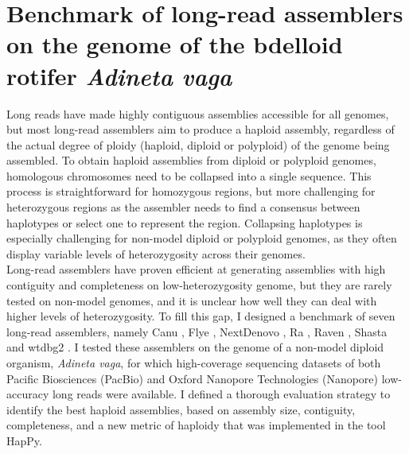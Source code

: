 
\newcommand{\beginsupplement}{%
        \setcounter{table}{0}
        \renewcommand{\thetable}{S\arabic{table}}%
        \setcounter{figure}{0}
        \renewcommand{\thefigure}{S\arabic{figure}}%
     }

\chapter{Benchmark of long-read assemblers on the genome of the bdelloid rotifer \textit{Adineta vaga}}

Long reads have made highly contiguous assemblies accessible for all genomes, but most long-read assemblers aim to produce a haploid assembly, regardless of the actual degree of ploidy (haploid, diploid or polyploid) of the genome being assembled. To obtain haploid assemblies from diploid or polyploid genomes, homologous chromosomes need to be collapsed into a single sequence. This process is straightforward for homozygous regions, but more challenging for heterozygous regions as the assembler needs to find a consensus between haplotypes or select one to represent the region. Collapsing haplotypes is especially challenging for non-model diploid or polyploid genomes, as they often display variable levels of heterozygosity across their genomes. \\

Long-read assemblers have proven efficient at generating assemblies with high contiguity and completeness on low-heterozygosity genome, but they are rarely tested on non-model genomes, and it is unclear how well they can deal with higher levels of heterozygosity. To fill this gap, I designed a benchmark of seven long-read assemblers, namely Canu \cite{canu}, Flye \cite{flye}, NextDenovo \cite{nextdenovo}, Ra \cite{ra}, Raven \cite{raven}, Shasta \cite{shasta} and wtdbg2 \cite{wtdbg2}. I tested these assemblers on the genome of a non-model diploid organism, \textit{Adineta vaga}, for which high-coverage sequencing datasets of both Pacific Biosciences (PacBio) and Oxford Nanopore Technologies (Nanopore) low-accuracy long reads were available. I defined a thorough evaluation strategy to identify the best haploid assemblies, based on assembly size, contiguity, completeness, and a new metric of haploidy that was implemented in the tool HapPy. \\


